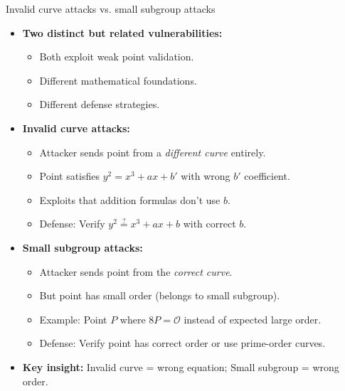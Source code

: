 \documentclass[aspectratio=169, lualatex, handout]{beamer}
\begin{document}
\begin{frame}{Invalid curve attacks vs. small subgroup attacks}
	\begin{itemize}[<+->]
		\item \textbf{Two distinct but related vulnerabilities:}
		      \begin{itemize}
			      \item Both exploit weak point validation.
			      \item Different mathematical foundations.
			      \item Different defense strategies.
		      \end{itemize}
		\item \textbf{Invalid curve attacks:}
		      \begin{itemize}
			      \item Attacker sends point from a \emph{different curve} entirely.
			      \item Point satisfies $y^2 = x^3 + ax + b'$ with wrong $b'$ coefficient.
			      \item Exploits that addition formulas don't use $b$.
			      \item Defense: Verify $y^2 \stackrel{?}{=} x^3 + ax + b$ with correct $b$.
		      \end{itemize}
		\item \textbf{Small subgroup attacks:}
		      \begin{itemize}
			      \item Attacker sends point from the \emph{correct curve}.
			      \item But point has small order (belongs to small subgroup).
			      \item Example: Point $P$ where $8P = \mathcal{O}$ instead of expected large order.
			      \item Defense: Verify point has correct order or use prime-order curves.
		      \end{itemize}
		\item \textbf{Key insight:} Invalid curve = wrong equation; Small subgroup = wrong order.
	\end{itemize}
\end{frame}
\end{document}
